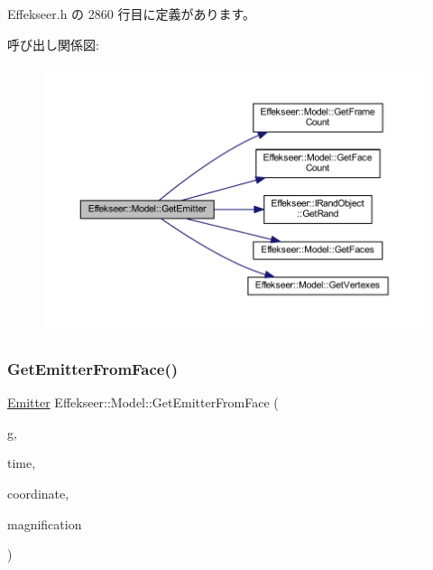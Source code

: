  Effekseer.\+h の 2860 行目に定義があります。

呼び出し関係図\+:\nopagebreak
\begin{figure}[H]
\begin{center}
\leavevmode
\includegraphics[width=350pt]{class_effekseer_1_1_model_a42ec48630c9d7f8d0232777102bffe9a_cgraph}
\end{center}
\end{figure}
\mbox{\label{class_effekseer_1_1_model_aef7548be4adad150a7f573ac977d89c7}} 
\subsubsection{\texorpdfstring{Get\+Emitter\+From\+Face()}{GetEmitterFromFace()}\hspace{0.1cm}{\footnotesize\ttfamily [1/2]}}
{\footnotesize\ttfamily \mbox{\hyperlink{struct_effekseer_1_1_model_1_1_emitter}{Emitter}} Effekseer\+::\+Model\+::\+Get\+Emitter\+From\+Face (\begin{DoxyParamCaption}\item[{\mbox{\hyperlink{class_effekseer_1_1_i_rand_object}{I\+Rand\+Object}} $\ast$}]{g,  }\item[{int32\+\_\+t}]{time,  }\item[{\mbox{\hyperlink{namespace_effekseer_ac8508f8823c5fcf36aac5d2ddee23765}{Coordinate\+System}}}]{coordinate,  }\item[{float}]{magnification }\end{DoxyParamCaption})\hspace{0.3cm}{\ttfamily [inline]}}



